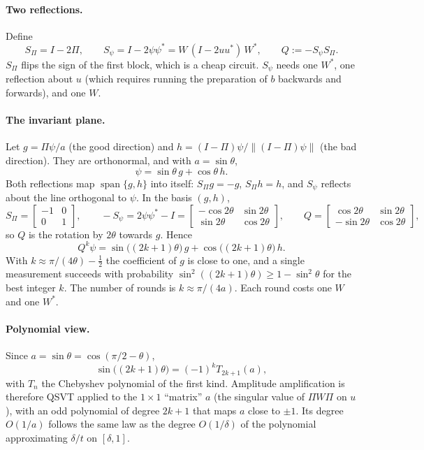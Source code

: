 \documentclass[11pt,a4paper]{article}
\begin{document}
\paragraph{Two reflections.} Define
\[
S_\Pi=I-2\Pi,\qquad S_\psi=I-2\psi\psi^*=W\,(I-2uu^*)\,W^*,\qquad Q:=-S_\psi S_\Pi .
\]
$S_\Pi$ flips the sign of the first block, which is a cheap circuit. $S_\psi$ needs
one $W^*$, one reflection about $u$ (which requires running the preparation
of $b$ backwards and forwards), and one $W$.

\paragraph{The invariant plane.} Let $g=\Pi\psi/a$ (the good direction) and
$h=(I-\Pi)\psi/\|(I-\Pi)\psi\|$ (the bad direction). They are orthonormal, and with
$a=\sin\theta$,
\[
\psi=\sin\theta\,g+\cos\theta\,h .
\]
Both reflections map $\operatorname{span}\{g,h\}$ into itself: $S_\Pi g=-g$, $S_\Pi h=h$, and $S_\psi$
reflects about the line orthogonal to $\psi$. In the basis $(g,h)$,
\[
S_\Pi=\begin{bmatrix}-1&0\\0&1\end{bmatrix},\qquad
-S_\psi=2\psi\psi^*-I=\begin{bmatrix}-\cos2\theta&\sin2\theta\\ \sin2\theta&\cos2\theta\end{bmatrix},\qquad
Q=\begin{bmatrix}\cos2\theta&\sin2\theta\\ -\sin2\theta&\cos2\theta\end{bmatrix},
\]
so $Q$ is the rotation by $2\theta$ towards $g$. Hence
\[
Q^k\psi=\sin\big((2k+1)\theta\big)\,g+\cos\big((2k+1)\theta\big)\,h .
\]
With $k\approx\pi/(4\theta)-\tfrac12$ the coefficient of $g$ is close to one, and a single
measurement succeeds with probability $\sin^2((2k+1)\theta)\ge1-\sin^2\theta$ for
the best integer $k$. The number of rounds is $k\approx\pi/(4a)$. Each round
costs one $W$ and one $W^*$.

\paragraph{Polynomial view.} Since $a=\sin\theta=\cos(\pi/2-\theta)$,
\[
\sin\big((2k+1)\theta\big)=(-1)^kT_{2k+1}(a),
\]
with $T_n$ the Chebyshev polynomial of the first kind. Amplitude
amplification is therefore QSVT applied to the $1\times1$ ``matrix'' $a$ (the
singular value of $\Pi W\Pi$ on $u$), with an odd polynomial of degree $2k+1$
that maps $a$ close to $\pm1$. Its degree $O(1/a)$ follows the same law as the
degree $O(1/\delta)$ of the polynomial approximating $\delta/t$ on $[\delta,1]$.
\end{document}

